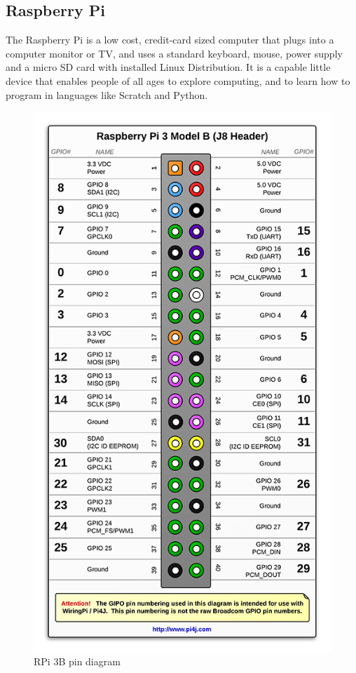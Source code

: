 \documentclass[11pt]{article}
\begin{document}
	\subsection{Raspberry Pi}
		The Raspberry Pi is a low cost, credit-card sized computer that plugs into a computer monitor or TV, and uses a standard keyboard, mouse, power supply and a micro SD card with installed Linux Distribution. It is a capable little device that enables people of all ages to explore computing, and to learn how to program in languages like Scratch and Python.
	\begin{figure}[h]
	\centering
		\begin{minipage}[t]{.5\linewidth}
		\includegraphics[scale=1]{rasp}
		\caption{ RPi 3B pin diagram}
		\label{fig:1}  
		\end{minipage}
	\end{figure}
\end{document}
